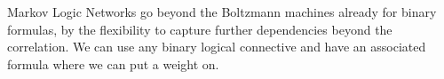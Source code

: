 


Markov Logic Networks go beyond the Boltzmann machines already for binary formulas, by the flexibility to capture further dependencies beyond the correlation.
We can use any binary logical connective and have an associated formula where we can put a weight on.






%
%
%
%
%









